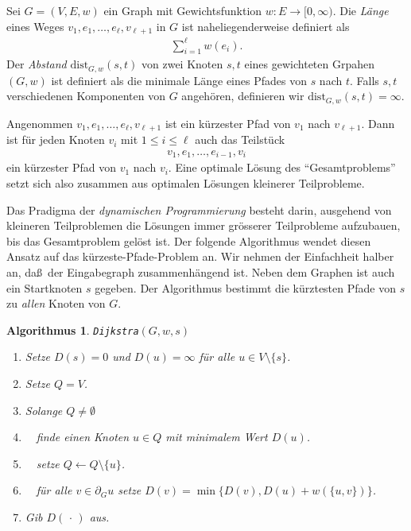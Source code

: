 \documentclass[10pt,reqno]{amsart}
\numberwithin{equation}{section}
\newcommand\nix{\,\cdot\,}
\newtheorem{algorithm}[definition]{Algorithmus}
\newcommand\dist{\mathrm{dist}}
\begin{document}
Sei $G=(V,E,w)$ ein Graph mit Gewichtsfunktion $w:E\to[0,\infty)$.
Die \emph{L\"ange} eines Weges $v_1,e_1,\ldots,e_\ell,v_{\ell+1}$ in $G$ ist naheliegenderweise definiert als
\begin{align*}
	\sum_{i=1}^\ell w(e_i).
\end{align*}
Der {\em Abstand} $\dist_{G,w}(s,t)$ von zwei Knoten $s,t$ eines gewichteten Grpahen $(G,w)$ ist definiert als die minimale L\"ange eines Pfades von $s$ nach $t$.
Falls $s,t$ verschiedenen Komponenten von $G$ angeh\"oren, definieren wir $\dist_{G,w}(s,t)=\infty$.

Angenommen $v_1,e_1,\ldots,e_\ell,v_{\ell+1}$ ist ein k\"urzester Pfad von $v_1$ nach $v_{\ell+1}$.
Dann ist f\"ur jeden Knoten $v_i$ mit $1\leq i\leq\ell$ auch das Teilst\"uck
\begin{align*}
	v_1,e_1,\ldots,e_{i-1},v_i
\end{align*}
ein k\"urzester Pfad von $v_1$ nach $v_i$.
Eine optimale L\"osung des ``Gesamtproblems'' setzt sich also zusammen aus optimalen L\"osungen kleinerer Teilprobleme.

Das Pradigma der {\em dynamischen Programmierung} besteht darin, ausgehend von kleineren Teilproblemen die L\"osungen immer gr\"osserer Teilprobleme aufzubauen, bis das Gesamtproblem gel\"ost ist.
Der folgende Algorithmus wendet diesen Ansatz auf das k\"urzeste-Pfade-Problem an.
Wir nehmen der Einfachheit halber an, da\ss\ der Eingabegraph zusammenh\"angend ist.
Neben dem Graphen ist auch ein Startknoten $s$ gegeben.
Der Algorithmus bestimmt die k\"urztesten Pfade von $s$ zu {\em allen} Knoten von $G$.

\begin{algorithm}{\tt Dijkstra}$(G,w,s)$
	\begin{enumerate}
		\item Setze $D(s)=0$ und $D(u)=\infty$ f\"ur alle $u\in V\setminus\{s\}$.
		\item Setze $Q=V$.
		\item Solange $Q\neq\emptyset$
		\item $\quad$finde einen Knoten $u\in Q$ mit minimalem Wert $D(u)$.
		\item $\quad$setze $Q\leftarrow Q\setminus\{u\}$.
		\item $\quad$f\"ur alle $v\in\partial_G u$ setze $D(v)=\min\{D(v),D(u)+w(\{u,v\})\}$.
		\item Gib $D(\nix)$ aus.
	\end{enumerate}
\end{algorithm}
\end{document}

